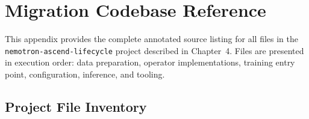 
\chapter{Migration Codebase Reference}
\label{app:codebase}

This appendix provides the complete annotated source listing for
all files in the \texttt{nemotron-ascend-lifecycle} project
described in Chapter~4. Files are presented in execution order:
data preparation, operator implementations, training entry point,
configuration, inference, and tooling.

\section{Project File Inventory}
\label{app:file-inventory}

